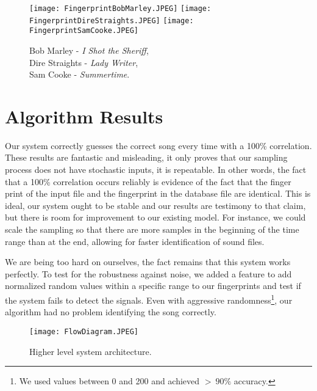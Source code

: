\begin{figure}[h!]
	\begin{center}
		\texttt{[image: FingerprintBobMarley.JPEG]}
		\texttt{[image: FingerprintDireStraights.JPEG]}
		\texttt{[image: FingerprintSamCooke.JPEG]}
	\end{center}
	\vspace{-1em}
	\caption{ Bob Marley - \textit{I Shot the Sheriff}, \\ Dire Straights - \textit{Lady Writer}, \\ Sam Cooke - \textit{Summertime}. }
	\label{Fingerprints}
\end{figure}


%
%

\section{Algorithm Results}

Our system correctly guesses the correct song every time with a 100\% correlation. These results are fantastic and misleading, it only proves that our sampling process does not have stochastic inputs, it is repeatable. In other words, the fact that a 100\% correlation occurs reliably is evidence of the fact that the finger print of the input file and the fingerprint in the database file are identical. This is ideal, our system ought to be stable and our results are testimony to that claim, but there is room for improvement to our existing model. For instance, we could scale the sampling so that there are more samples in the beginning of the time range than at the end, allowing for faster identification of sound files.

We are being too hard on ourselves, the fact remains that this system works perfectly. To test for the robustness against noise, we added a feature to add normalized random values within a specific range to our fingerprints and test if the system fails to detect the signals. Even with aggressive randomness\footnote{We used values between 0 and 200 and achieved $> \: 90 \%$ accuracy.}, our algorithm had no problem identifying the song correctly.

\begin{figure}[h!]
	\begin{center}
		\texttt{[image: FlowDiagram.JPEG]}
	\end{center}
	\vspace{-1em}
	\caption{ Higher level system architecture. }
	\label{Flow}
\end{figure}





